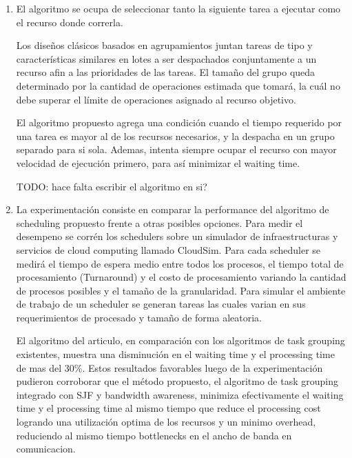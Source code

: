 \begin{enumerate}[label=\alph*)]

    \item El algoritmo se ocupa de seleccionar tanto
        la siguiente tarea a ejecutar como el recurso donde correrla.

        Los diseños clásicos basados en agrupamientos juntan tareas de tipo
        y características similares en lotes a ser despachados conjuntamente
        a un recurso afin a las prioridades de las tareas.
        El tamaño del grupo queda determinado por la cantidad de operaciones
        estimada que tomará, la cuál no debe superar el límite de operaciones
        asignado al recurso objetivo.

        El algoritmo propuesto agrega una condición cuando el tiempo requerido
        por una tarea es mayor al de los recursos necesarios, y la despacha
        en un grupo separado para si sola. Ademas, intenta siempre ocupar
        el recurso con mayor velocidad de ejecución primero, para así minimizar
        el waiting time.

        TODO: hace falta escribir el algoritmo en si?

    \item La experimentación consiste en comparar la performance del algoritmo de scheduling propuesto frente a otras posibles opciones. Para medir el desempeno se corrén los schedulers sobre un simulador de infraestructuras y servicios de cloud computing llamado CloudSim. Para cada scheduler se medirá el tiempo de espera medio entre todos los procesos, el tiempo total de procesamiento (Turnaround) y el costo de procesamiento variando la cantidad de procesos posibles y el tamaño de la granularidad. Para simular el ambiente de trabajo de un scheduler se generan tareas las cuales varian en sus requerimientos de procesado y tamaño de forma aleatoria.

El algoritmo del articulo, en comparación con los algoritmos de task grouping existentes, muestra una disminución en el waiting time y el processing time de mas del 30\%. Estos resultados favorables luego de la experimentación pudieron corroborar que el método propuesto, el algoritmo de task grouping integrado con SJF y bandwidth awareness, minimiza efectivamente el waiting time y el processing time al mismo tiempo que reduce el processing cost logrando una utilización optima de los recursos y un minimo overhead, reduciendo al mismo tiempo bottlenecks en el ancho de banda en comunicacion.

\end{enumerate}

